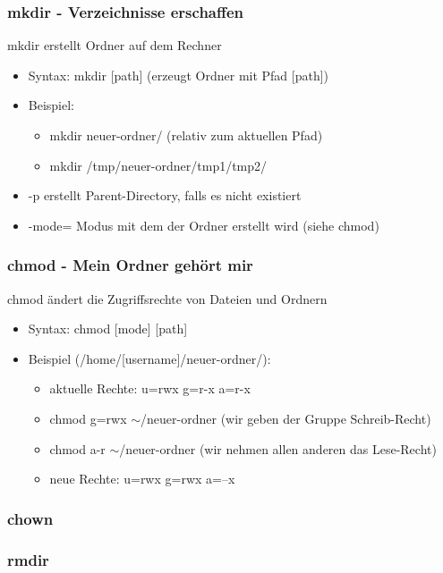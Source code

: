 \documentclass[12pt,utf8]{beamer}
\begin{document}
\begin{frame}
\frametitle{mkdir - Verzeichnisse erschaffen}
mkdir erstellt Ordner auf dem Rechner
\begin{itemize}[<+->]
	\item Syntax: mkdir [path]   (erzeugt Ordner mit Pfad [path])
	\item Beispiel:
	\begin{itemize}[<+->]
		\item mkdir neuer-ordner/    (relativ zum aktuellen Pfad)
		\item mkdir /tmp/neuer-ordner/tmp1/tmp2/
	\end{itemize}
	\item -p   erstellt Parent-Directory, falls es nicht existiert
	\item -mode=  Modus mit dem der Ordner erstellt wird (siehe chmod)
\end{itemize}
\end{frame}

\begin{frame}
\frametitle{chmod - Mein Ordner gehört mir}
chmod ändert die Zugriffsrechte von Dateien und Ordnern
\begin{itemize}[<+->]
	\item Syntax: chmod [mode] [path]
	\item Beispiel (/home/[username]/neuer-ordner/):
	\begin{itemize}[<+->]
		\item aktuelle Rechte: u=rwx g=r-x a=r-x
		\item chmod g=rwx $\sim$/neuer-ordner (wir geben der Gruppe Schreib-Recht)
		\item chmod a-r $\sim$/neuer-ordner (wir nehmen allen anderen das Lese-Recht)
		\item neue Rechte: u=rwx g=rwx a=--x
	\end{itemize}
\end{itemize}
\end{frame}

\begin{frame}
\frametitle{chown}
\end{frame}

\begin{frame}
\frametitle{rmdir}
\end{frame}
\end{document}
